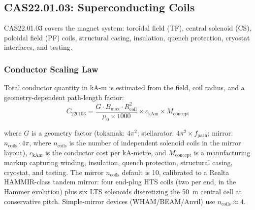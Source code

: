 \documentclass{article}
\begin{document}
\subsection{CAS22.01.03: Superconducting Coils}
\label{sec:cas2203}

CAS22.01.03 covers the magnet system: toroidal field (TF), central
solenoid (CS), poloidal field (PF) coils, structural casing,
insulation, quench protection, cryostat interfaces, and testing.

\subsubsection{Conductor Scaling Law}
Total conductor quantity in kA-m is estimated from the field, coil
radius, and a geometry-dependent path-length factor:
\begin{equation}
\label{eq:cas2203}
C_{220103} = \frac{G \cdot B_{\max} \cdot R_{\text{coil}}^2}
                   {\mu_0 \times 1000}
             \times c_{\text{kAm}}
             \times M_{\text{concept}}
\end{equation}

\noindent where $G$ is a geometry factor (tokamak: $4\pi^2$;
stellarator: $4\pi^2 \times f_{\text{path}}$; mirror:
$n_{\text{coils}} \cdot 4\pi$, where $n_{\text{coils}}$ is the
number of independent solenoid coils in the mirror layout),
$c_{\text{kAm}}$ is the conductor cost per kA-metre, and
$M_{\text{concept}}$ is a manufacturing markup capturing winding,
insulation, quench protection, structural casing, cryostat, and testing.
The mirror $n_{\text{coils}}$ default is 10, calibrated to a Realta
HAMMIR-class tandem mirror: four end-plug HTS coils (two per end, in
the Hammer evolution) plus six LTS solenoids discretizing the 50~m
central cell at conservative pitch. Simple-mirror devices
(WHAM/BEAM/Anvil) use $n_{\text{coils}} \approx 4$.
\end{document}
